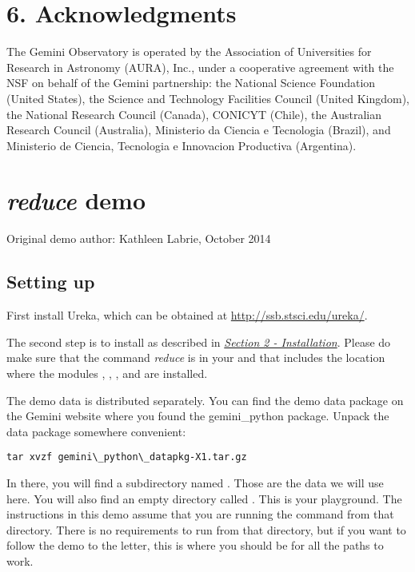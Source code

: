 \documentclass[letterpaper,10pt,english]{sphinxmanual}
\begin{document}
\chapter{6. Acknowledgments}
\label{ack::doc}\label{ack:acknowledgments}
The Gemini Observatory is operated by the Association of Universities for
Research in Astronomy (AURA), Inc., under a cooperative agreement with the NSF on
behalf of the Gemini partnership: the National Science Foundation
(United States), the Science and Technology Facilities Council (United Kingdom),
the National Research Council (Canada), CONICYT (Chile), the Australian
Research Council (Australia), Ministerio da Ciencia e Tecnologia (Brazil),
and Ministerio de Ciencia, Tecnologia e Innovacion Productiva (Argentina).
\appendix
\noappendicestocpagenum
\addappheadtotoc

\chapter{\emph{reduce} demo}
\label{appendices/appendix_demo::doc}\label{appendices/appendix_demo:reduce-demo}
Original demo author: Kathleen Labrie, October 2014


\section{Setting up}
\label{appendices/appendix_demo:setting-up}
First install Ureka, which can be obtained at \href{http://ssb.stsci.edu/ureka/}{http://ssb.stsci.edu/ureka/}.

The second step is to install  as described in
{\hyperref[userenv:config]{\emph{Section 2 - Installation}}}.
Please do make sure that the command \emph{reduce} is in your  and that
 includes the location where the modules , ,
, and  are installed.

The demo data is distributed separately.  You can find the demo data package
 on the Gemini website where you found the
gemini\_python package.  Unpack the data package somewhere convenient:

\begin{Verbatim}[commandchars=\\\{\}]
tar xvzf gemini\_python\_datapkg-X1.tar.gz
\end{Verbatim}

In there, you will find a subdirectory named .  Those are
the data we will use here.  You will also find an empty directory called
.  This is your playground. The instructions in this demo assume that
you are running the  command from that directory.  There is no requirements
to run  from that directory, but if you want to follow the demo to the
letter, this is where you should be for all the paths to work.
\end{document}
